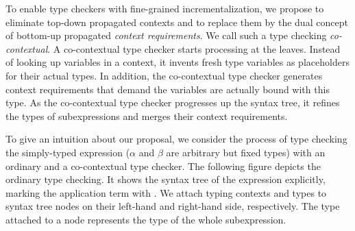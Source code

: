 \documentclass{llncs}
\begin{document}
To enable type checkers with fine-grained incrementalization, we propose to eliminate top-down propagated contexts and to replace them by the dual concept of bottom-up propagated \emph{context
requirements}. We call such a type checking \emph{co-contextual}. A co-contextual type
checker starts processing at the leaves. Instead of looking up variables in a context, it invents fresh type variables as placeholders for their actual types. In addition, the co-contextual type checker
generates context requirements that demand the variables are actually bound with
this type. As the co-contextual type checker progresses up the syntax
tree, it refines the types of subexpressions and merges their context requirements.

To give an intuition about our proposal, 
we consider the process of type checking the simply-typed expression
 ($\alpha$ and $\beta$
are arbitrary but fixed types) with an ordinary and a co-contextual  type checker.
The following figure depicts the ordinary type checking. 
It shows the syntax tree of the expression explicitly, marking the application term with
\appNode. We attach typing contexts and types to syntax tree nodes on
their left-hand and right-hand side, respectively. The type attached
to a node represents the type of the whole subexpression.
%
\end{document}
